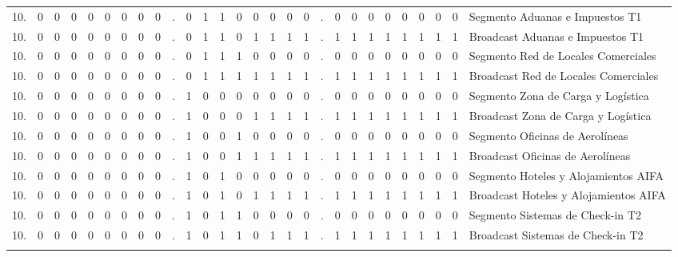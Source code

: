 \begin{center}
{\begin{tabular}{r cccccccc c cccccccc c cccccccc l}
10. & 0 & 0 & 0 & 0 & 0 & 0 & 0 & 0 & . & 0 & 1 & 1 & \multicolumn{1}{c|}{0} & 0 & 0 & 0 & 0 & . & 0 & 0 & 0 & 0 & 0 & 0 & 0 & 0 & Segmento Aduanas e Impuestos T1 \\
10. & 0 & 0 & 0 & 0 & 0 & 0 & 0 & 0 & . & 0 & 1 & 1 & \multicolumn{1}{c|}{0} & 1 & 1 & 1 & 1 & . & 1 & 1 & 1 & 1 & 1 & 1 & 1 & 1 & Broadcast Aduanas e Impuestos T1 \\
\addlinespace

10. & 0 & 0 & 0 & 0 & 0 & 0 & 0 & 0 & . & 0 & 1 & 1 & \multicolumn{1}{c|}{1} & 0 & 0 & 0 & 0 & . & 0 & 0 & 0 & 0 & 0 & 0 & 0 & 0 & Segmento Red de Locales Comerciales \\
10. & 0 & 0 & 0 & 0 & 0 & 0 & 0 & 0 & . & 0 & 1 & 1 & \multicolumn{1}{c|}{1} & 1 & 1 & 1 & 1 & . & 1 & 1 & 1 & 1 & 1 & 1 & 1 & 1 & Broadcast Red de Locales Comerciales \\
\addlinespace

10. & 0 & 0 & 0 & 0 & 0 & 0 & 0 & 0 & . & 1 & 0 & 0 & \multicolumn{1}{c|}{0} & 0 & 0 & 0 & 0 & . & 0 & 0 & 0 & 0 & 0 & 0 & 0 & 0 & Segmento Zona de Carga y Logística \\
10. & 0 & 0 & 0 & 0 & 0 & 0 & 0 & 0 & . & 1 & 0 & 0 & \multicolumn{1}{c|}{0} & 1 & 1 & 1 & 1 & . & 1 & 1 & 1 & 1 & 1 & 1 & 1 & 1 & Broadcast Zona de Carga y Logística \\
\addlinespace

10. & 0 & 0 & 0 & 0 & 0 & 0 & 0 & 0 & . & 1 & 0 & 0 & \multicolumn{1}{c|}{1} & 0 & 0 & 0 & 0 & . & 0 & 0 & 0 & 0 & 0 & 0 & 0 & 0 & Segmento Oficinas de Aerolíneas \\
10. & 0 & 0 & 0 & 0 & 0 & 0 & 0 & 0 & . & 1 & 0 & 0 & \multicolumn{1}{c|}{1} & 1 & 1 & 1 & 1 & . & 1 & 1 & 1 & 1 & 1 & 1 & 1 & 1 & Broadcast Oficinas de Aerolíneas \\
\addlinespace

10. & 0 & 0 & 0 & 0 & 0 & 0 & 0 & 0 & . & 1 & 0 & 1 & \multicolumn{1}{c|}{0} & 0 & 0 & 0 & 0 & . & 0 & 0 & 0 & 0 & 0 & 0 & 0 & 0 & Segmento Hoteles y Alojamientos AIFA \\
10. & 0 & 0 & 0 & 0 & 0 & 0 & 0 & 0 & . & 1 & 0 & 1 & \multicolumn{1}{c|}{0} & 1 & 1 & 1 & 1 & . & 1 & 1 & 1 & 1 & 1 & 1 & 1 & 1 & Broadcast Hoteles y Alojamientos AIFA \\
\addlinespace

10. & 0 & 0 & 0 & 0 & 0 & 0 & 0 & 0 & . & 1 & 0 & 1 & 1 & \multicolumn{1}{c|}{0} & 0 & 0 & 0 & . & 0 & 0 & 0 & 0 & 0 & 0 & 0 & 0 & Segmento Sistemas de Check-in T2 \\
10. & 0 & 0 & 0 & 0 & 0 & 0 & 0 & 0 & . & 1 & 0 & 1 & 1 & \multicolumn{1}{c|}{0} & 1 & 1 & 1 & . & 1 & 1 & 1 & 1 & 1 & 1 & 1 & 1 & Broadcast Sistemas de Check-in T2 \\
\addlinespace


\end{tabular}}
\end{center}
